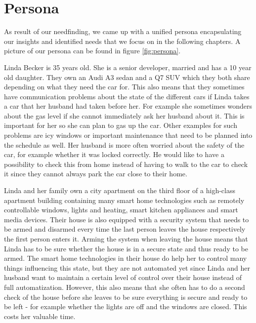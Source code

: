 \section{Persona}
\label{sec:persona}

As result of our needfinding, we came up with a unified persona encapsulating our insights and identified needs that we focus on in the following chapters. A picture of our persona can be found in figure \ref{fig:persona}.

Linda Becker is 35 years old. She is a senior developer, married and has a 10 year old daughter. They own an Audi A3 sedan and a Q7 SUV which they both share depending on what they need the car for. This also means that they sometimes have communication problems about the state of the different cars if Linda takes a car that her husband had taken before her. For example she sometimes wonders about the gas level if she cannot immediately ask her husband about it. This is important for her so she can plan to gas up the car. Other examples for such problems are icy windows or important maintenance that need to be planned into the schedule as well. Her husband is more often worried about the safety of the car, for example whether it was locked correctly. He would like to have a possibility to check this from home instead of having to walk to the car to check it since they cannot always park the car close to their home.

Linda and her family own a city apartment on the third floor of a high-class apartment building containing many smart home technologies such as remotely controllable windows, lights and heating, smart kitchen appliances and smart media devices. Their house is also equipped with a security system that needs to be armed and disarmed every time the last person leaves the house respectively the first person enters it. Arming the system when leaving the house means that Linda has to be sure whether the house is in a secure state and thus ready to be armed. The smart home technologies in their house do help her to control many things influencing this state, but they are not automated yet since Linda and her husband want to maintain a certain level of control over their house instead of full automatization. However, this also means that she often has to do a second check of the house before she leaves to be sure everything is secure and ready to be left - for example whether the lights are off and the windows are closed. This costs her valuable time. 

